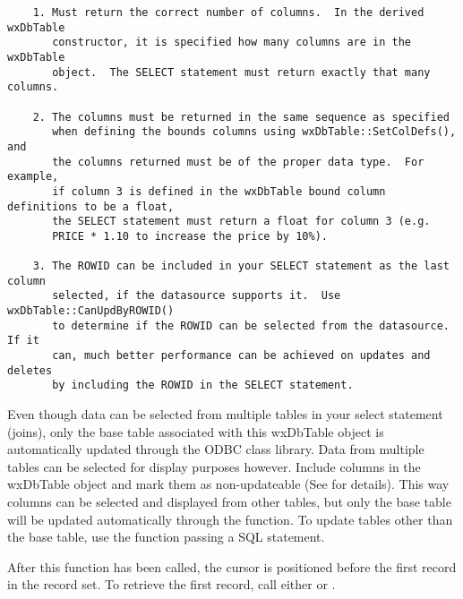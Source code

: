\begin{verbatim}
    1. Must return the correct number of columns.  In the derived wxDbTable 
       constructor, it is specified how many columns are in the wxDbTable 
       object.  The SELECT statement must return exactly that many columns.

    2. The columns must be returned in the same sequence as specified 
       when defining the bounds columns using wxDbTable::SetColDefs(), and 
       the columns returned must be of the proper data type.  For example, 
       if column 3 is defined in the wxDbTable bound column definitions to be a float, 
       the SELECT statement must return a float for column 3 (e.g. 
       PRICE * 1.10 to increase the price by 10%).

    3. The ROWID can be included in your SELECT statement as the last column 
       selected, if the datasource supports it.  Use wxDbTable::CanUpdByROWID() 
       to determine if the ROWID can be selected from the datasource.  If it 
       can, much better performance can be achieved on updates and deletes 
       by including the ROWID in the SELECT statement.
\end{verbatim}

Even though data can be selected from multiple tables in your select 
statement (joins), only the base table associated with this wxDbTable object
is automatically updated through the ODBC class library.  Data from multiple 
tables can be selected for display purposes however.  Include columns in 
the wxDbTable object and mark them as non-updateable (See 
 for details).  This way columns can be 
selected and displayed from other tables, but only the base table will be 
updated automatically through the  
function.  To update tables other than the base table, use the 
 function passing a SQL statement.

After this function has been called, the cursor is positioned before the 
first record in the record set.  To retrieve the first record, call 
either  or 
.


